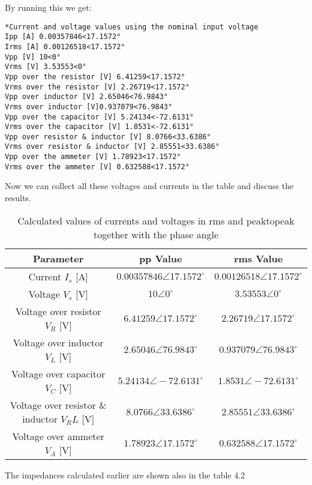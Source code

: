 \documentclass[12pt]{report}
\begin{document}
By running this we get:
\begin{verbatim}
*Current and voltage values using the nominal input voltage 
Ipp [A] 0.00357846<17.1572°
Irms [A] 0.00126518<17.1572°
Vpp [V] 10<0°
Vrms [V] 3.53553<0°
Vpp over the resistor [V] 6.41259<17.1572°
Vrms over the resistor [V] 2.26719<17.1572°
Vpp over inductor [V] 2.65046<76.9843°
Vrms over inductor [V]0.937079<76.9843°
Vpp over the capacitor [V] 5.24134<-72.6131°
Vrms over the capacitor [V] 1.8531<-72.6131°
Vpp over resistor & inductor [V] 8.0766<33.6386°
Vrms over resistor & inductor [V] 2.85551<33.6386°
Vpp over the ammeter [V] 1.78923<17.1572°
Vrms over the ammeter [V] 0.632588<17.1572°
\end{verbatim}
Now we can collect all these voltages and currents in the table and discuss the results. \\
\renewcommand{\arraystretch}{1.5}
\begin{table}[ht]
\centering
\begin{tabular}{|c|c|c|}
\hline
\rowcolor{lightblue} \textbf{Parameter} & \textbf{pp Value} & \textbf{rms Value}\\
\hline
Current $I_s$ [A] & $0.00357846\angle 17.1572^\circ $  & $0.00126518\angle 17.1572^\circ $\\
\hline
Voltage $V_s$ [V] & $10\angle0^\circ$  & $3.53553\angle0^\circ$\\
\hline
Voltage over resistor $V_R$ [V] & $ 6.41259\angle 17.1572^\circ$ &  $2.26719\angle 17.1572^\circ$\\
\hline
Voltage over inductor $V_L$ [V] & $2.65046\angle 76.9843^\circ$ &  $0.937079\angle 76.9843^\circ$ \\
\hline
Voltage over capacitor $V_C$ [V] & $5.24134\angle -72.6131^\circ$ &  $1.8531\angle -72.6131^\circ$ \\
\hline
Voltage over resistor \& inductor $V_RL$ [V] & $8.0766\angle 33.6386^\circ$ & $2.85551\angle 33.6386^\circ$ \\
\hline
Voltage over ammeter $V_A$ [V] & $1.78923\angle 17.1572^\circ$ & $0.632588\angle 17.1572^\circ$ \\
\hline
\end{tabular}
\caption{Calculated values of currents and voltages in rms and peaktopeak together with the phase angle}
\end{table}
\newpage 
The impedances calculated earlier are shown also in the table 4.2
\end{document}
